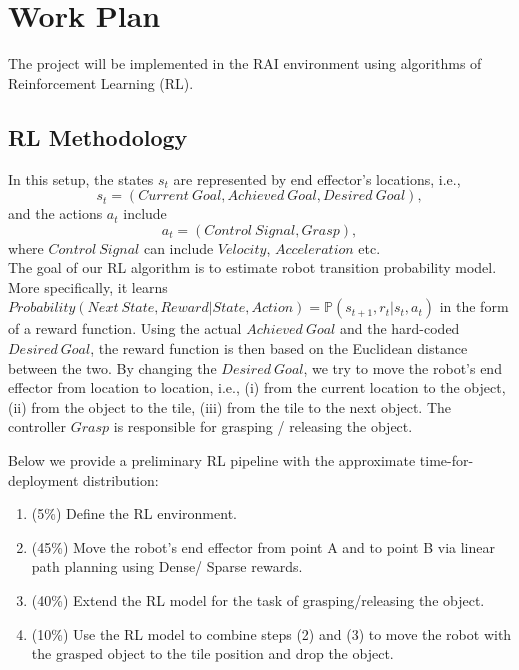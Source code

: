 \documentclass[a4paper,11pt,twoside]{article}
\begin{document}
\section{Work Plan} \label{Sec:WorkPlan}
The project will be implemented in the RAI environment using algorithms of Reinforcement Learning (RL).

\subsection{RL Methodology} \label{SubSec:RL}
In this setup, the states $s_t$ are represented by end effector's locations, i.e., 
\begin{equation*}
	s_t = (Current~Goal, Achieved~Goal, Desired~Goal),
\end{equation*}
and the actions $a_t$ include
\begin{equation*}
	a_t = (Control~Signal, Grasp),
\end{equation*}
where $Control~Signal$ can include $Velocity$, $Acceleration$ etc.\\

The goal of our RL algorithm is to estimate robot transition probability model. More specifically, it learns $Probability(Next~State, Reward | State, Action) = \mathbb{P}(s_{t+1}, r_t| s_t, a_t)$ in the form of a reward function. Using the actual $Achieved~Goal$ and the hard-coded $Desired~Goal$, the reward function is then based on the Euclidean distance between the two. By changing the $Desired~Goal$, we try to move the robot's end effector from location to location, i.e., (i) from the current location to the object, (ii) from the object to the tile, (iii) from the tile to the next object. The controller $Grasp$ is responsible for grasping / releasing the object.

Below we provide a preliminary RL pipeline with the approximate time-for-deployment distribution:
\begin{enumerate}
\item (5\%) Define the RL environment.
\item (45\%) Move the robot's end effector from point A and to point B via linear path planning using Dense/ Sparse rewards.
\item (40\%) Extend the RL model for the task of grasping/releasing the object.
\item (10\%) Use the RL model to combine steps (2) and (3) to move the robot with the grasped object to the tile position and drop the object.
\end{enumerate}
\end{document}
